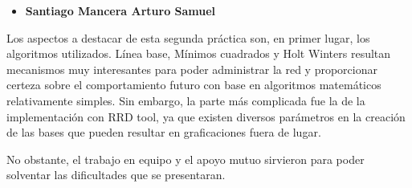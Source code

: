 \begin{itemize}
\item \textbf{Santiago Mancera Arturo Samuel}
\end{itemize}

Los aspectos a destacar de esta segunda práctica son, en primer lugar, los algoritmos utilizados. Línea base, Mínimos cuadrados y Holt Winters resultan mecanismos muy interesantes para poder administrar la red y proporcionar certeza sobre el comportamiento futuro con base en algoritmos matemáticos relativamente simples. Sin embargo, la parte más complicada fue la de la implementación con RRD tool, ya que existen diversos parámetros en la creación de las bases que pueden resultar en graficaciones fuera de lugar.

No obstante, el trabajo en equipo y el apoyo mutuo sirvieron para poder solventar las dificultades que se presentaran.